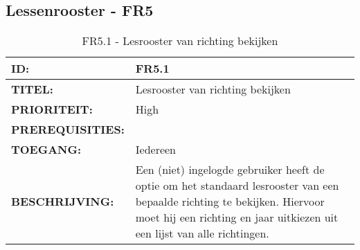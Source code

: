 \subsection{Lessenrooster - FR5}

\noindent\begin{table}[H]
            \begin{tabular}{l | p{10cm}}
                \textbf{ID:} & FR5.1 \\ \hline
                \textbf{TITEL:} & Lesrooster van richting bekijken \\ \hline
                \textbf{PRIORITEIT:} &  High \\ \hline
                \textbf{PREREQUISITIES:} & \\ \hline
                \textbf{TOEGANG:} &  Iedereen \\ \hline
                \textbf{BESCHRIJVING:} & Een (niet) ingelogde gebruiker heeft de optie om het standaard lesrooster van een bepaalde richting te bekijken. Hiervoor moet hij een richting en jaar uitkiezen uit een lijst van alle richtingen.\\
            \end{tabular}\\
            \caption{FR5.1 - Lesrooster van richting bekijken}
            \label{tab:FR5.1 - Lesrooster van richting bekijken}
        \end{table}

